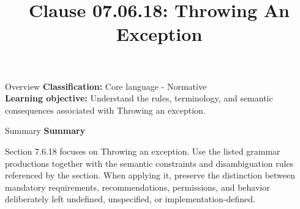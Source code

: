 \documentclass[10pt,letterpaper]{article}
\title{Clause 07.06.18: Throwing An Exception}
\author{}
\date{}
\begin{document}
\maketitle
\begin{CornellOverviewBox}{Overview}
\textbf{Classification:} Core language - Normative\\[2pt]
\textbf{Learning objective:} Understand the rules, terminology, and semantic consequences associated with Throwing an exception.
\end{CornellOverviewBox}\begin{CornellSummaryBox}{Summary}
{\sffamily\bfseries\color{Accent} Summary}\par\vspace{3pt}Section 7.6.18 focuses on Throwing an exception. Use the listed grammar productions together with the semantic constraints and disambiguation rules referenced by the section. When applying it, preserve the distinction between mandatory requirements, recommendations, permissions, and behavior deliberately left undefined, unspecified, or implementation-defined.
\end{CornellSummaryBox}
\end{document}
